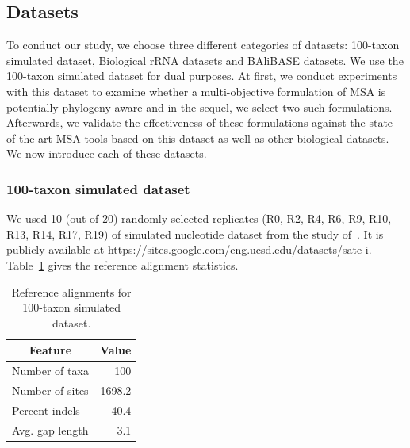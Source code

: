 \subsection{Datasets}
To conduct our study, we choose three different categories of datasets: 100-taxon simulated dataset, Biological rRNA datasets and BAliBASE datasets. We use the 100-taxon simulated dataset for dual purposes. At first, we conduct experiments with this dataset to examine whether a multi-objective formulation of MSA is potentially phylogeny-aware and in the sequel, we select two such formulations. Afterwards, we validate the effectiveness of these formulations against the state-of-the-art MSA tools based on this dataset as well as other biological datasets. We now introduce each of these datasets.

\subsubsection{100-taxon simulated dataset}
We used 10 (out of 20) randomly selected replicates (R0, R2, R4, R6, R9, R10, R13, R14, R17, R19) of simulated nucleotide dataset from the study of~\citealp{liu2009rapid}. It is publicly available at \url{https://sites.google.com/eng.ucsd.edu/datasets/sate-i}. Table~\ref{tab:sim_stat} gives the reference alignment statistics.

\begin{table}[htbp]
	\centering
	\caption{Reference alignments for 100-taxon simulated dataset.}
	   \begin{tabular}{|l|r|}
		\hline
		\multicolumn{1}{|c|}{Feature} & \multicolumn{1}{c|}{Value} \\
		\hline
		Number of taxa & 100 \\
		\hline
		Number of sites & 1698.2 \\
		\hline
		Percent indels & 40.4 \\
		\hline
		Avg. gap length & 3.1 \\
		\hline
		\end{tabular}%
	\label{tab:sim_stat}%
\end{table}%


